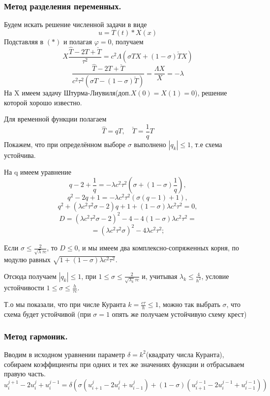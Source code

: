 \documentclass[12pt,a4paper]{article}
\begin{document}
\subsubsection{Метод разделения переменных.}
	 
Будем искать решение численной задачи в виде $$u = T(t)*X(x)$$
Подставляя в $(*)$ и полагая $\varphi = 0$, получаем $$X\frac{\hat{T}-2T +\check{T}}{\tau^2} = c^2\Lambda(\sigma TX+(1-\sigma)\check{T}X)$$ $$\frac{\hat{T}-2T +\check{T}}{c^2\tau^2(\sigma T - (1-\sigma)\check{T})} = \frac{\Lambda X}{X} = -\lambda $$
На X имеем задачу Штурма-Лиувиля(доп.$ X(0) = X(1) = 0$), решение которой хорошо известно. 

Для временной функции полагаем $$\hat{T} = qT , \quad\check{T} = \frac{1}{q}T$$
Покажем, что при определённом выборе $\sigma$ выполнено $|q_{k}|\leqslant 1$, т.е схема устойчива.


 На q имеем уравнение
 $$q - 2 + \frac{1}{q} = -\lambda c^2\tau^2(\sigma +(1-\sigma)\frac{1}{q}),$$
					 $$q^2-2q+1 = -\lambda c^2\tau^2(\sigma(q-1) + 1),$$
					 $$q^2+(\lambda c^2\tau^2\sigma-2)q+1+(1-\sigma)\lambda c^2\tau^2 = 0,$$
					 $$D = (\lambda c^2\tau^2\sigma-2)^2 -4 - 4(1-\sigma)\lambda c^2\tau^2 = $$
					 $$= (\lambda c^2\tau^2\sigma)^2 - 4\lambda c^2\tau^2; $$


Если $\sigma \leqslant\frac{2}{\sqrt{\lambda}\tau c} $, то $ D\leqslant 0$, и мы имеем два комплексно-сопряженных корня, по модулю равных $\sqrt{1+(1-\sigma)\lambda c^2\tau^2}$.

Отсюда получаем $ |q_{k}| \leqslant 1 $, при  $ 1\leqslant\sigma \leqslant \frac{2}{\sqrt{\lambda_{k}}\tau c}$ и, учитывая $\lambda_k \leqslant \frac{4}{h^2}$, условие устойчивости $1\leqslant\sigma \leqslant \frac{h}{\tau c}$.

Т.о мы показали, что при числе Куранта $k =\frac{c\tau}{h}\leqslant1$, можно так выбрать $\sigma$, что схема будет устойчивой (при $\sigma = 1$ опять же получаем устойчивую схему крест)

\subsubsection{Метод гармоник.}
Вводим в  исходном уравнении параметр $\delta = k^2$(квадрату числа Куранта), собираем коэффициенты при одних и тех же значениях функции и отбрасываем правую часть.
$${u_i^{j+1}- 2u_i^j + u_i^{j-1}} = \delta(\sigma(u_{i+1}^j- 2u_i^j + u_{i-1}^j) + (1-\sigma)(u_{i+1}^{j-1}- 2u_i^{j-1} + u_{i-1}^{j-1})) $$
 
\end{document}
